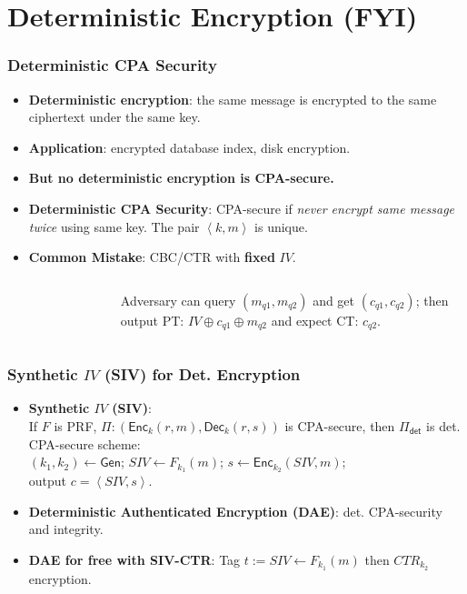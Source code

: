 \section{Deterministic Encryption (FYI)}
\begin{frame}\frametitle{Deterministic CPA Security}
\begin{itemize}
\item \textbf{Deterministic encryption}: the same message is encrypted to the same ciphertext under the same key.
\item \textbf{Application}: encrypted database index, disk encryption.
\item \textbf{But no  deterministic encryption is CPA-secure.}
\item \textbf{Deterministic CPA Security}: CPA-secure if \emph{never encrypt same message twice} using same key. The pair $\left<k,m\right>$ is unique.
\item \textbf{\alert{Common Mistake}}: CBC/CTR with \textbf{fixed} $IV$.
\begin{columns}[C]
\begin{figure}
\begin{center}

\end{center}
\end{figure}
Adversary can query $(m_{q1}, m_{q2})$ and get $(c_{q1}, c_{q2})$; then output PT: $ IV\oplus c_{q1} \oplus m_{q2}$ and expect CT: $c_{q2}$.
\end{columns}
\end{itemize}
\end{frame}
\begin{frame}\frametitle{Synthetic $IV$ (SIV) for Det. Encryption}
\begin{itemize}
\item \textbf{Synthetic $IV$ (SIV)}: \\
If $F$ is PRF, $\Pi:(\mathsf{Enc}_k(r,m), \mathsf{Dec}_k(r,s))$ is CPA-secure, then $\Pi_{\mathsf{det}}$ is det. CPA-secure scheme: \\ $(k_1,k_2) \gets \mathsf{Gen}$;
$SIV \gets F_{k_1}(m)$; $s \gets \mathsf{Enc}_{k_2}(SIV,m)$; \\ output $c = \left<SIV,s \right>$.
\item \textbf{Deterministic Authenticated Encryption (DAE)}: det. CPA-security and integrity.
\item \textbf{DAE for free with SIV-CTR}: Tag $t := SIV \gets F_{k_1}(m) $ then $CTR_{k_2}$ encryption.
\begin{figure}
\begin{center}

\end{center}
\end{figure}
\end{itemize}
\end{frame}
